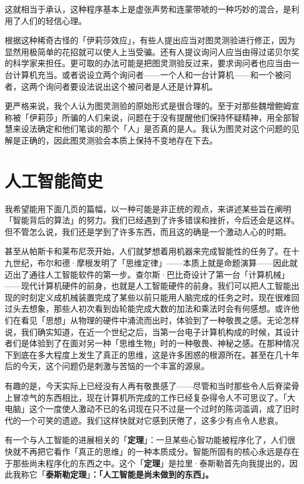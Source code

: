 \documentclass[
  12pt,
  twoside,
  openright,
  oldfontcommands,
]{memoir}
\newcommand{\heititext}[1]{{\heifamily\bfseries #1}}
\begin{document}
这就相当于承认，这种程序基本上是虚张声势和连蒙带唬的一种巧妙的混合，是利用了人们的轻信心理。

根据这种稀奇古怪的「伊莉莎效应」，有些人提出应当对图灵测验进行修正，因为显然用极简单的花招就可以使人上当受骗。还有人提议询问人应当由得过诺贝尔奖的科学家来担任。更可取的办法可能是把图灵测验反过来，要求询问者也应当由一台计算机充当。或者说设立两个询问者------一个人和一台计算机------和一个被问者，这两个询问者要设法说出这个被问者是人还是计算机。

更严格来说，我个人认为图灵测验的原始形式是很合理的。至于对那些魏增鲍姆宣称被「伊莉莎」所骗的人们来说，问题在于没有提醒他们保持怀疑精神，用全部智慧来设法确定和他们笔谈的那个「人」是否真的是人。我认为图灵对这个问题的见解是正确的，因此图灵测验会本质上保持不变地存在下去。

\section{人工智能简史}

我希望能用下面几页的篇幅，以一种可能是非正统的观点，来讲述某些旨在阐明「智能背后的算法」的努力。我们已经遇到了许多错误和挫折，今后还会是这样。但不管怎么说，我们还是学到了许多东西，而且这的确是一个激动人心的时期。

甚至从帕斯卡和莱布尼茨开始，人们就梦想着用机器来完成智能性的任务了。在十九世纪，布尔和德·摩根发明了「思维定律」------本质上就是命题演算------因此就迈出了通往人工智能软件的第一步。查尔斯·巴比奇设计了第一台「计算机械」------现代计算机硬件的前身，也就是人工智能硬件的前身。我们可以把人工智能出现的时刻定义成机械装置完成了某些以前只能用人脑完成的任务之时。现在很难回过头去想象，那些人初次看到齿轮能完成大数的加法和乘法时会有何感想。或许他们在看见「思想」从物理的硬件中涌流而出时，体验到了一种敬畏之感。无论怎样说，我们确实知道，在近一个世纪之后，当第一台电子计算机构成的时候，其设计者们是体验到了在面对另一种「思维生物」时的一种敬畏、神秘之感。在那种情况下到底在多大程度上发生了真正的思维，这是许多困惑的根源所在。甚至在几十年后的今天，这个问题仍是刺激与苦恼的一个丰富的源泉。

有趣的是，今天实际上已经没有人再有敬畏感了------尽管和当时那些令人后脊梁骨上冒凉气的东西相比，现在计算机所完成的工作已经复杂得令人不可思议了。「大电脑」这个一度使人激动不已的名词现在只不过是一个过时的陈词滥调，成了旧时代的一个可笑的遗迹。我们这样快就对它感到厌倦了，这多少有点令人悲哀。

有一个与人工智能的进展相关的「\heititext{定理}」：一旦某些心智功能被程序化了，人们很快就不再把它看作「真正的思维」的一种本质成分。智能所固有的核心永远是存在于那些尚未程序化的东西之中。这个「\heititext{定理}」是拉里·泰斯勒首先向我提出的，因此我称它「\heititext{泰斯勒定理}」\heititext{：「人工智能是尚未做到的东西」。}
\end{document}
